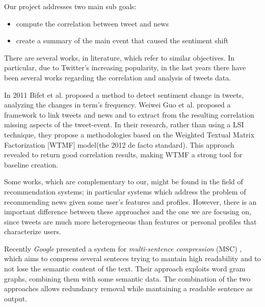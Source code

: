 Our project addresses two main sub goals:
\begin{itemize}
	\item compute the correlation between tweet and news
	\item create a summary of the main event that caused the sentiment shift
\end{itemize}


 
There are several works, in literature, which refer to similar objectives. In particular, due to Twitter’s increasing popularity, in the last years there have been several works regarding the correlation and analysis of tweets data. 
 
 
In 2011 Bifet et al. \cite{Bifet}proposed a method to detect sentiment change in tweets, analyzing the changes in term's frequency. 
Weiwei Guo et al.\cite{LTN} proposed a framework to link tweets and news and to extract from the resulting correlation missing aspects of the tweet-event.
In their research, rather than using a LSI technique, they propose a methodologies based on the Weighted Textual Matrix Factorization\cite{WTMF}
[WTMF] model(the 2012 de facto standard).
This approach revealed to return good correlation results, making WTMF a strong tool for baseline creation.

Some works, which are complementary to our, might be found in the field of recommendation systems; in particular systems which address the problem of recommending news given some user’s features and profiles.
However, there is an important difference between these approaches and the one we are focusing on, since tweets are much more heterogeneous than features or personal profiles that characterize users. 

Recently \emph{Google} presented a system for \emph{multi-sentence compression} (MSC) \cite{MSC}, which aims
to compress several senteces trying to mantain high readability and to not lose
the semantic content of the text. Their approach exploits word gram graphs,
combining them with some semantic data. The combination of the two approaches
allows redundancy removal while mantaining a readable sentence as output.


